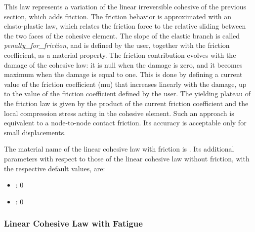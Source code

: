This law represents a variation of the linear irreversible cohesive of
the previous section, which adds friction.  The friction behavior is
approximated with an elasto-plastic law, which relates the friction
force to the relative sliding between the two faces of the cohesive
element.  The slope of the elastic branch is called
\emph{penalty\_for\_friction}, and is defined by the user, together
with the friction coefficient, as a material property.  The friction
contribution evolves with the damage of the cohesive law: it is null
when the damage is zero, and it becomes maximum when the damage is
equal to one.  This is done by defining a current value of the
friction coefficient (mu) that increases linearly with the damage, up
to the value of the friction coefficient defined by the user.  The
yielding plateau of the friction law is given by the product of the
current friction coefficient and the local compression stress acting
in the cohesive element.  Such an approach is equivalent to a
node-to-node contact friction. Its accuracy is acceptable only for
small displacements.

The material name of the linear cohesive law with friction is
. Its additional parameters
with respect to those of the linear cohesive law without friction,
with the respective default values, are:
\begin{itemize}
\item {}: 0
\item {}: 0
\end{itemize}


\subsubsection{Linear Cohesive Law with Fatigue}

